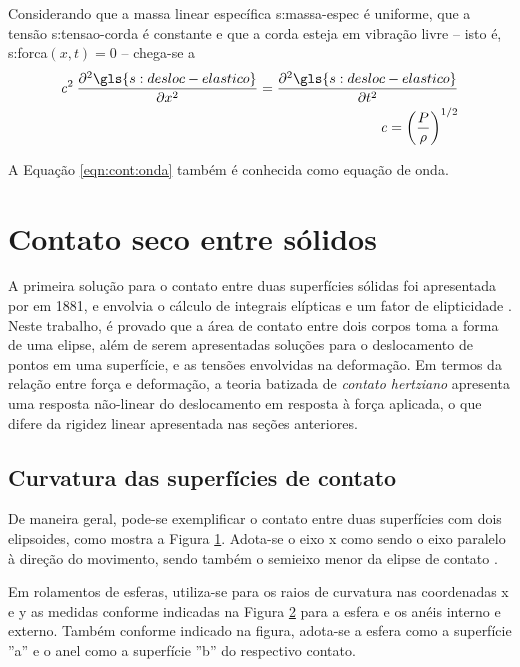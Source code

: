 \documentclass[12pt,oneside,english,brazil,lmodern,siglas,simbolos,cite=num]{ucsmonograph}
\begin{document}
	Considerando que a massa linear específica \gls{s:massa-espec} é uniforme, que a tensão \gls{s:tensao-corda} é constante e que a corda esteja em vibração livre -- isto é, \gls{s:forca}$(x,t) = 0$ -- chega-se a \cite{rao:2008}
	\begin{align}
		\mathit{c}^2\:\frac{\partial^2
		\gls{s:desloc-elastico}}{\partial x^2}=\frac{\partial^2
		\gls{s:desloc-elastico}}{\partial t^2} \label{eqn:cont:onda}\\
		\mathit{c} = \left(\frac{P}{\rho}\right)^{1/2}
	\end{align}
	
	A Equação \ref{eqn:cont:onda} também é conhecida como equação de onda. 
	
	\section{Contato seco entre sólidos} \label{sec:contato-seco}
	A primeira solução para o contato entre duas superfícies sólidas foi apresentada por  em 1881, e envolvia o cálculo de integrais elípticas e um fator de elipticidade \cite{hertz:1881}.
	Neste trabalho, é provado que a área de contato entre dois corpos toma a forma de uma elipse, além de serem apresentadas soluções para o deslocamento de pontos em uma superfície, e as tensões envolvidas na deformação.
	Em termos da relação entre força e deformação, a teoria batizada de \emph{contato hertziano} apresenta uma resposta não-linear do deslocamento em resposta à força aplicada, o que difere da rigidez linear apresentada nas seções anteriores.
	
	\subsection{Curvatura das superfícies de contato} \label{sec:curvatura-contato}
	De maneira geral, pode-se exemplificar o contato entre duas superfícies com dois elipsoides, como mostra a Figura \ref{fig:contato-elipses}.
	Adota-se o eixo x como sendo o eixo paralelo à direção do movimento, sendo também o semieixo menor da elipse de contato \cite{hamrock:1991}.
	\begin{figure}[h]
		\label{fig:contato-elipses}
	\end{figure}

	Em rolamentos de esferas, utiliza-se para os raios de curvatura nas coordenadas x e y as medidas conforme indicadas na Figura \ref{fig:raios-rolamento} para a esfera e os anéis interno e externo.
	Também conforme indicado na figura, adota-se a esfera como a superfície ''a'' e o anel como a superfície ''b'' do respectivo contato.
	\begin{figure}[b]
		\label{fig:raios-rolamento}
	\end{figure}
\end{document}
